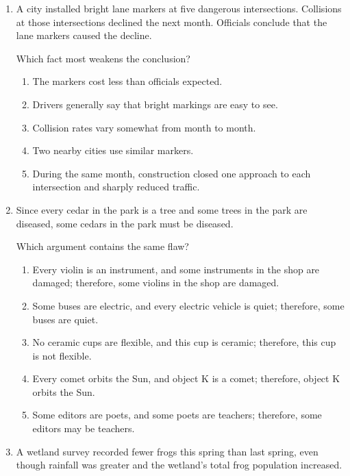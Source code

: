 \begin{enumerate}
\item A city installed bright lane markers at five dangerous intersections. Collisions at those intersections declined the next month. Officials conclude that the lane markers caused the decline.

Which fact most weakens the conclusion?
\begin{enumerate}
\item[(A)] The markers cost less than officials expected.
\item[(B)] Drivers generally say that bright markings are easy to see.
\item[(C)] Collision rates vary somewhat from month to month.
\item[(D)] Two nearby cities use similar markers.
\item[(E)] During the same month, construction closed one approach to each intersection and sharply reduced traffic.
\end{enumerate}

\item Since every cedar in the park is a tree and some trees in the park are diseased, some cedars in the park must be diseased.

Which argument contains the same flaw?
\begin{enumerate}
\item[(A)] Every violin is an instrument, and some instruments in the shop are damaged; therefore, some violins in the shop are damaged.
\item[(B)] Some buses are electric, and every electric vehicle is quiet; therefore, some buses are quiet.
\item[(C)] No ceramic cups are flexible, and this cup is ceramic; therefore, this cup is not flexible.
\item[(D)] Every comet orbits the Sun, and object K is a comet; therefore, object K orbits the Sun.
\item[(E)] Some editors are poets, and some poets are teachers; therefore, some editors may be teachers.
\end{enumerate}

\item A wetland survey recorded fewer frogs this spring than last spring, even though rainfall was greater and the wetland's total frog population increased.


\end{enumerate}
